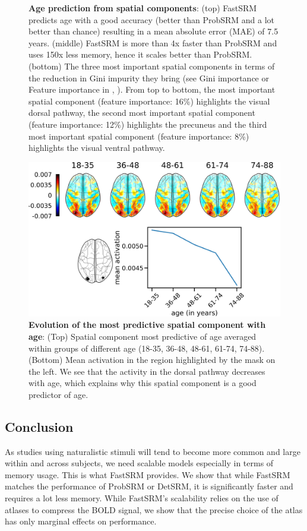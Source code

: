\begin{figure}
\caption{\textbf{Age prediction from spatial components}: (top) FastSRM predicts age with a good accuracy (better than ProbSRM and a lot better than chance) resulting in a mean absolute error (MAE) of 7.5 years. (middle) FastSRM is more than 4x faster than ProbSRM and uses 150x less memory, hence it scales better than ProbSRM. (bottom) The three most important spatial components in terms of the reduction in Gini impurity they bring (see Gini importance or Feature importance in \cite{breiman2001random}, \cite{louppe2013understanding}). From top to bottom, the most important spatial component (feature importance: 16\%) highlights the visual dorsal pathway, the second most important spatial component (feature importance: 12\%) highlights the precuneus and the third most important spatial component (feature importance: 8\%) highlights the visual ventral pathway.} 
\label{fig:predict_age}
\end{figure}

\begin{figure}
\centering
\includegraphics[scale=0.35]{figures/srm/feature_importance_age_prediction.png}
\caption{\textbf{Evolution of the most predictive spatial component with age}: (Top) Spatial component most predictive of age averaged within groups of different age (18-35, 36-48, 48-61, 61-74, 74-88). (Bottom) Mean activation in the region highlighted by the mask on the left. We see that the activity in the dorsal pathway decreases with age, which explains why this spatial component is a good predictor of age.}
\label{fig:predict_age_interpretation}
\end{figure}



\subsection{Conclusion}
As studies using naturalistic stimuli will tend to become more common and large within and across subjects, we need scalable models especially in terms of memory usage.
%
This is what FastSRM provides.
%
We show that while FastSRM matches the performance of ProbSRM or DetSRM, it is
significantly faster and requires a lot less memory. While FastSRM's scalability relies on the use of atlases to compress the BOLD signal, we show that the precise choice of the atlas has only marginal effects on performance.


